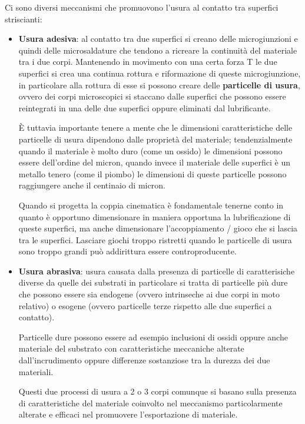 Ci sono diversi meccanismi che promuovono l'usura al contatto tra superfici striscianti:
\begin{itemize}
\item \textbf{Usura adesiva}: al contatto tra due superfici si creano delle microgiunzioni e quindi delle microsaldature che tendono a ricreare la continuità del materiale tra i due corpi. Mantenendo in movimento con una certa forza T le due superfici si crea una continua rottura e riformazione di queste microgiunzione, in particolare alla rottura di esse si possono creare delle \textbf{particelle di usura}, ovvero dei corpi microscopici si staccano dalle superfici che possono essere reintegrati in una delle due superfici oppure eliminati dal lubrificante.

È tuttavia importante tenere a mente che le dimensioni caratteristiche delle particelle di usura dipendono dalle proprietà del materiale; tendenzialmente quando il materiale è molto duro (come un ossido) le dimensioni possono essere dell'ordine del micron, quando invece il materiale delle superfici è un metallo tenero (come il piombo) le dimensioni di queste particelle possono raggiungere anche il centinaio di micron.

Quando si progetta la coppia cinematica è fondamentale tenerne conto in quanto è opportuno dimensionare in maniera opportuna la lubrificazione di queste superfici, ma anche dimensionare l'accoppiamento / gioco che si lascia tra le superfici. Lasciare giochi troppo ristretti quando le particelle di usura sono troppo grandi può addirittura essere controproducente.
\item \textbf{Usura abrasiva}: usura causata dalla presenza di particelle di caratterisiche diverse da quelle dei substrati in particolare si tratta di particelle più dure che possono essere sia endogene (ovvero intrinseche ai due corpi in moto relativo) o esogene (ovvero particelle terze rispetto alle due superfici a contatto).

Particelle dure possono essere ad esempio inclusioni di ossidi oppure anche materiale del substrato con caratteristiche meccaniche alterate dall'incrudimento oppure differenze sostanziose tra la durezza dei due materiali.

Questi due processi di usura a 2 o 3 corpi comunque si basano sulla presenza di caratteristiche del materiale coinvolto nel meccanismo particolarmente alterate e efficaci nel promuovere l'esportazione di materiale.


\end{itemize}
